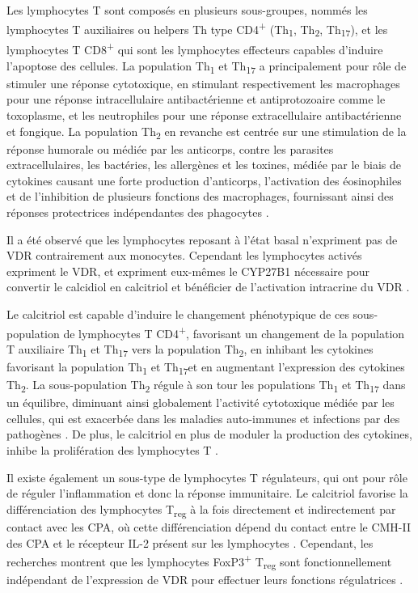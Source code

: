 \documentclass[
  a4paper,
  DIV=11,
  numbers=noendperiod,
  listof=totoc]{scrreprt}
\begin{document}
Les lymphocytes T sont composés en plusieurs sous-groupes, nommés les
lymphocytes T auxiliaires ou helpers \acs{Th} type
CD4\textsuperscript{+} (Th\textsubscript{1}, Th\textsubscript{2},
Th\textsubscript{17}), et les lymphocytes T CD8\textsuperscript{+} qui
sont les lymphocytes effecteurs capables d'induire l'apoptose des
cellules. La population Th\textsubscript{1} et Th\textsubscript{17} a
principalement pour rôle de stimuler une réponse cytotoxique, en
stimulant respectivement les macrophages pour une réponse
intracellulaire antibactérienne et antiprotozoaire comme le toxoplasme,
et les neutrophiles pour une réponse extracellulaire antibactérienne et
fongique. La population Th\textsubscript{2} en revanche est centrée sur
une stimulation de la réponse humorale ou médiée par les anticorps,
contre les parasites extracellulaires, les bactéries, les allergènes et
les toxines, médiée par le biais de cytokines causant une forte
production d'anticorps, l'activation des éosinophiles et de l'inhibition
de plusieurs fonctions des macrophages, fournissant ainsi des réponses
protectrices indépendantes des phagocytes
\autocite{Cantorna.2015,Walker.2018}.

Il a été observé que les lymphocytes reposant à l'état basal n'expriment
pas de \ac{VDR} contrairement aux monocytes. Cependant les lymphocytes
activés expriment le \ac{VDR}, et expriment eux-mêmes le \ac{CYP27B1}
nécessaire pour convertir le calcidiol en calcitriol et bénéficier de
l'activation intracrine du \ac{VDR} \autocite{Charoenngam.2020}.

Le calcitriol est capable d'induire le changement phénotypique de ces
sous-population de lymphocytes T CD4\textsuperscript{+}, favorisant un
changement de la population T auxiliaire Th\textsubscript{1} et
Th\textsubscript{17} vers la population Th\textsubscript{2}, en inhibant
les cytokines favorisant la population Th\textsubscript{1} et
Th\textsubscript{17}et en augmentant l'expression des cytokines
Th\textsubscript{2}. La sous-population Th\textsubscript{2} régule à son
tour les populations Th\textsubscript{1} et Th\textsubscript{17} dans un
équilibre, diminuant ainsi globalement l'activité cytotoxique médiée par
les cellules, qui est exacerbée dans les maladies auto-immunes et
infections par des pathogènes \autocite{Meza-Meza.2022}. De plus, le
calcitriol en plus de moduler la production des cytokines, inhibe la
prolifération des lymphocytes T \autocite{Cantorna.2015}.

Il existe également un sous-type de lymphocytes T régulateurs, qui ont
pour rôle de réguler l'inflammation et donc la réponse immunitaire. Le
calcitriol favorise la différenciation des lymphocytes
T\textsubscript{reg} à la fois directement et indirectement par contact
avec les \ac{CPA}, où cette différenciation dépend du contact entre le
\ac{CMH-II} des \ac{CPA} et le récepteur \ac{IL-2} présent sur les
lymphocytes \autocite{Charoenngam.2020}. Cependant, les recherches
montrent que les lymphocytes FoxP3\textsuperscript{+}
T\textsubscript{reg} sont fonctionnellement indépendant de l'expression
de VDR pour effectuer leurs fonctions régulatrices
\autocite{Cantorna.2010}.
\end{document}
